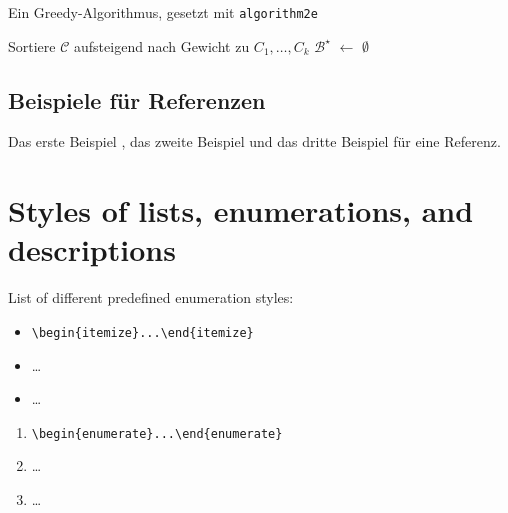 \documentclass[a4paper,ngerman]{tui-algo-seminar}
\begin{document}
\begin{algorithm}[ht]
  \caption{Ein Greedy-Algorithmus, gesetzt mit \texttt{algorithm2e}}
  Sortiere $\mathcal{C}$ aufsteigend nach Gewicht zu $C_1,\ldots,C_k$\;
  $\mathcal{B}^\star$ $\leftarrow$ $\emptyset$\; %
\end{algorithm}

\subsection{Beispiele für Referenzen}
\label{sub:beispiele_fur_referenzen}

Das erste Beispiel \cite{DBLP:journals/cacm/Knuth74}, das zweite Beispiel
\cite{DBLP:journals/cacm/Dijkstra68a} und  das dritte Beispiel \cite{DBLP:books/mk/GrayR93, DBLP:conf/focs/HopcroftPV75}
für eine Referenz.

\nocite{DBLP:conf/focs/FOCS16}





\appendix

\section{Styles of lists, enumerations, and descriptions}
\label{sec:itemStyles}

List of different predefined enumeration styles:

\begin{itemize}
\item \verb|\begin{itemize}...\end{itemize}|
\item \dots
\item \dots
\end{itemize}

\begin{enumerate}
\item \verb|\begin{enumerate}...\end{enumerate}|
\item \dots
\item \dots
\end{enumerate}
\end{document}
